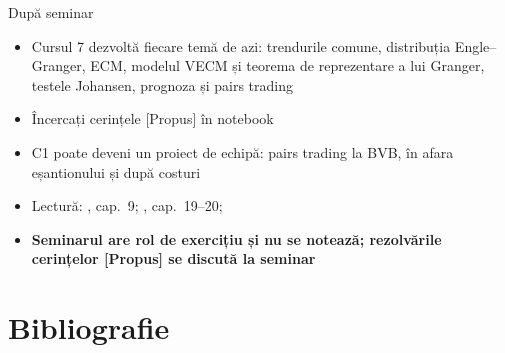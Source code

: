 \begin{frame}{După seminar}
\itemsize{\small}
\begin{itemize}
    \item Cursul 7 dezvoltă fiecare temă de azi: trendurile comune, distribuția Engle--Granger, ECM, modelul VECM și teorema de reprezentare a lui Granger, testele Johansen, prognoza și pairs trading
    \item Încercați cerințele [Propus] în notebook
    \item C1 poate deveni un proiect de echipă: pairs trading la BVB, în afara eșantionului și după costuri
    \item Lectură: , cap.~9; , cap.~19--20; 
    \item \textbf{Seminarul are rol de exercițiu și nu se notează; rezolvările cerințelor [Propus] se discută la seminar}
\end{itemize}
\end{frame}


\section{Bibliografie}


